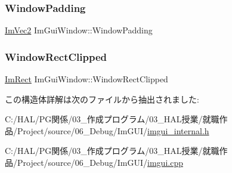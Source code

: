 \subsubsection{\texorpdfstring{Window\+Padding}{WindowPadding}}
{\footnotesize\ttfamily \mbox{\hyperlink{struct_im_vec2}{Im\+Vec2}} Im\+Gui\+Window\+::\+Window\+Padding}

\mbox{\label{struct_im_gui_window_ae0af9ff6c93baad6848143dd9d742ddd}} 
\subsubsection{\texorpdfstring{Window\+Rect\+Clipped}{WindowRectClipped}}
{\footnotesize\ttfamily \mbox{\hyperlink{struct_im_rect}{Im\+Rect}} Im\+Gui\+Window\+::\+Window\+Rect\+Clipped}



この構造体詳解は次のファイルから抽出されました\+:\begin{DoxyCompactItemize}
\item 
C\+:/\+H\+A\+L/\+P\+G関係/03\+\_\+作成プログラム/03\+\_\+\+H\+A\+L授業/就職作品/\+Project/source/06\+\_\+\+Debug/\+Im\+G\+U\+I/\mbox{\hyperlink{imgui__internal_8h}{imgui\+\_\+internal.\+h}}\item 
C\+:/\+H\+A\+L/\+P\+G関係/03\+\_\+作成プログラム/03\+\_\+\+H\+A\+L授業/就職作品/\+Project/source/06\+\_\+\+Debug/\+Im\+G\+U\+I/\mbox{\hyperlink{imgui_8cpp}{imgui.\+cpp}}\end{DoxyCompactItemize}

